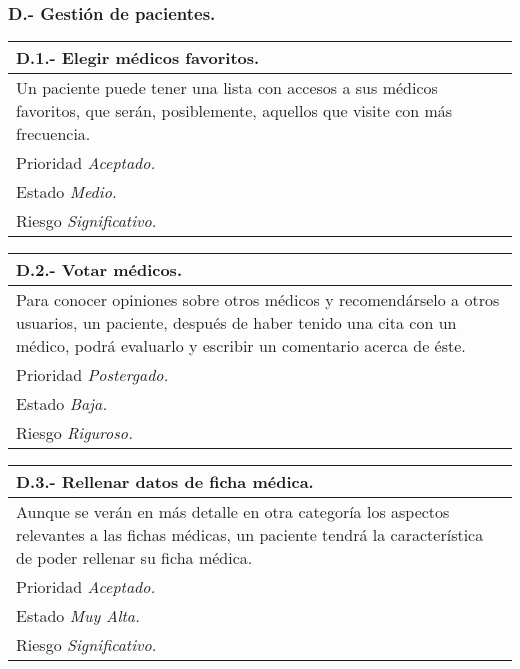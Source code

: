 	\subsubsection{D.- Gestión de pacientes.}

	\begin{center}
	\begin{tabulary}{15cm}{|L|}
		\hline
			\bf{D.1.- Elegir médicos favoritos.} \\
		\hline
			Un paciente puede tener una lista con accesos a sus médicos favoritos, que serán, posiblemente, aquellos que visite con más frecuencia. \\
		\hline
			Prioridad \textit{Aceptado.} \\
		\hline
			Estado \textit{Medio.} \\
		\hline
			Riesgo \textit{Significativo.} \\
		\hline
	\end{tabulary}
	\end{center}

	\begin{center}
	\begin{tabulary}{15cm}{|L|}
		\hline
			\bf{D.2.- Votar médicos.} \\
		\hline
			Para conocer opiniones sobre otros médicos y recomendárselo a otros usuarios, un paciente, después de haber tenido una cita con un médico, podrá evaluarlo y escribir un comentario acerca de éste. \\
		\hline
			Prioridad \textit{Postergado.} \\
		\hline
			Estado \textit{Baja.} \\
		\hline
			Riesgo \textit{Riguroso.} \\
		\hline
	\end{tabulary}
	\end{center}

	\begin{center}
	\begin{tabulary}{15cm}{|L|}
		\hline
			\bf{D.3.- Rellenar datos de ficha médica.} \\
		\hline
			Aunque se verán en más detalle en otra categoría los aspectos relevantes a las fichas médicas, un paciente tendrá la característica de poder rellenar su ficha médica. \\
		\hline
			Prioridad \textit{Aceptado.} \\
		\hline
			Estado \textit{Muy Alta.} \\
		\hline
			Riesgo \textit{Significativo.} \\
		\hline
	\end{tabulary}
	\end{center}

